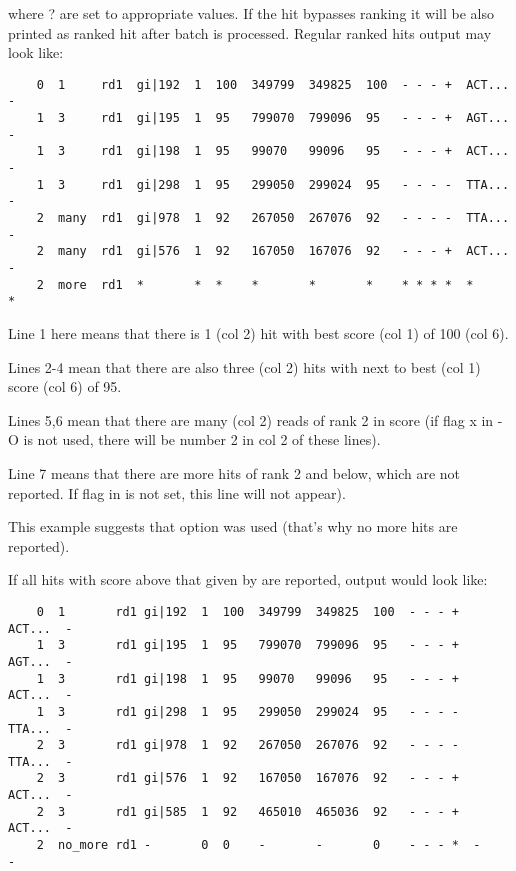 \documentclass[english]{article}
\begin{document}
    where ? are set to appropriate values. If the hit bypasses ranking it will
    be also printed as ranked hit after batch is processed. Regular ranked
    hits output may look like:

	\begin{verbatim}
    0  1     rd1  gi|192  1  100  349799  349825  100  - - - +  ACT...  -
    1  3     rd1  gi|195  1  95   799070  799096  95   - - - +  AGT...  -
    1  3     rd1  gi|198  1  95   99070   99096   95   - - - +  ACT...  -
    1  3     rd1  gi|298  1  95   299050  299024  95   - - - -  TTA...  -
    2  many  rd1  gi|978  1  92   267050  267076  92   - - - -  TTA...  -
    2  many  rd1  gi|576  1  92   167050  167076  92   - - - +  ACT...  -
    2  more  rd1  *       *  *    *       *       *    * * * *  *       *
	\end{verbatim}

    Line 1 here means that there is 1 (col 2) hit with best score (col 1) of 
    100 (col 6).

    Lines 2-4 mean that there are also three (col 2) hits with next to best 
    (col 1) score (col 6) of 95.

    Lines 5,6 mean that there are many (col 2) reads of rank 2 in score (if 
    flag x in -O is not used, there will be number 2 in col 2 of these lines).

    Line 7 means that there are more hits of rank 2 and below, which are not
    reported. If flag  in  is not set, this line will not appear).

    This example suggests that  option was used (that's why no more hits
    are reported).

    If all hits with score above that given by  are reported, output would
    look like:

	\begin{verbatim}
    0  1       rd1 gi|192  1  100  349799  349825  100  - - - +  ACT...  -
    1  3       rd1 gi|195  1  95   799070  799096  95   - - - +  AGT...  -
    1  3       rd1 gi|198  1  95   99070   99096   95   - - - +  ACT...  -
    1  3       rd1 gi|298  1  95   299050  299024  95   - - - -  TTA...  -
    2  3       rd1 gi|978  1  92   267050  267076  92   - - - -  TTA...  -
    2  3       rd1 gi|576  1  92   167050  167076  92   - - - +  ACT...  -
    2  3       rd1 gi|585  1  92   465010  465036  92   - - - +  ACT...  -
    2  no_more rd1 -       0  0    -       -       0    - - - *  -       -
	\end{verbatim}
\end{document}
